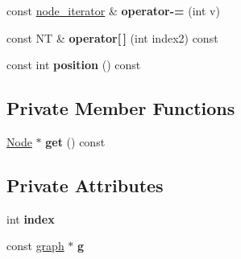 \begin{DoxyCompactItemize}
\item 
\hypertarget{classgraph_1_1node__iterator_af155e6e177ee131be5af6fed46133f03}{const \hyperlink{classgraph_1_1node__iterator}{node\+\_\+iterator} \& {\bfseries operator-\/=} (int v)}\label{classgraph_1_1node__iterator_af155e6e177ee131be5af6fed46133f03}

\item 
\hypertarget{classgraph_1_1node__iterator_ad725e0ed27e4bd369a42d5db8eabcc47}{const N\+T \& {\bfseries operator\mbox{[}$\,$\mbox{]}} (int index2) const }\label{classgraph_1_1node__iterator_ad725e0ed27e4bd369a42d5db8eabcc47}

\item 
\hypertarget{classgraph_1_1node__iterator_a51e4cfdb48a739751fbde6b9352703d2}{const int {\bfseries position} () const }\label{classgraph_1_1node__iterator_a51e4cfdb48a739751fbde6b9352703d2}

\end{DoxyCompactItemize}
\subsection*{Private Member Functions}
\begin{DoxyCompactItemize}
\item 
\hypertarget{classgraph_1_1node__iterator_aac5a348f5d4079b0010238d91a9aaa12}{\hyperlink{structgraph_1_1Node}{Node} $\ast$ {\bfseries get} () const }\label{classgraph_1_1node__iterator_aac5a348f5d4079b0010238d91a9aaa12}

\end{DoxyCompactItemize}
\subsection*{Private Attributes}
\begin{DoxyCompactItemize}
\item 
\hypertarget{classgraph_1_1node__iterator_acb4fc8365499193998c097adea839971}{int {\bfseries index}}\label{classgraph_1_1node__iterator_acb4fc8365499193998c097adea839971}

\item 
\hypertarget{classgraph_1_1node__iterator_a52d58638288d1a746c262b0ae3409301}{const \hyperlink{classgraph}{graph} $\ast$ {\bfseries g}}\label{classgraph_1_1node__iterator_a52d58638288d1a746c262b0ae3409301}

\end{DoxyCompactItemize}
